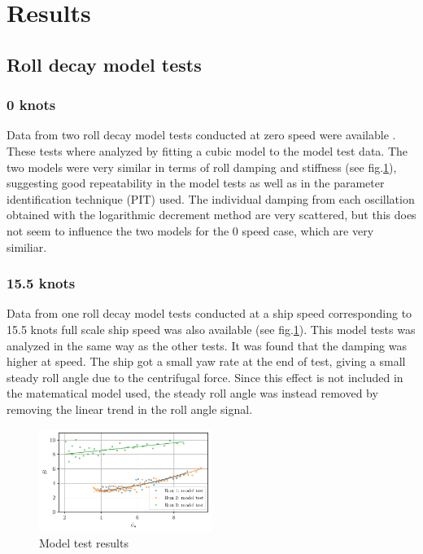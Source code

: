 \section{Results}\label{results}

    \subsection{Roll decay model tests}\label{roll-decay-model-tests}

\subsubsection{0 knots}\label{knots}

Data from two roll decay model tests conducted at zero speed were
available
.
These tests where analyzed by fitting a cubic model
to the model test data. The two models were very similar in terms of
roll damping and stiffness (see fig.\ref{fig:mdl}), suggesting
good repeatability in the model tests as well as in the parameter
identification technique (PIT) used. The individual damping from each
oscillation obtained with the logarithmic decrement method are very
scattered, but this does not seem to influence the two models for the 0
speed case, which are very similiar.

    \subsubsection{15.5 knots}\label{knots}

Data from one roll decay model tests conducted at a ship speed
corresponding to 15.5 knots full scale ship speed was also available
(see fig.\ref{fig:mdl}). This model tests was analyzed in the
same way as the other tests. It was found that the damping was higher at
speed. The ship got a small yaw rate
 at the end of test, giving a small steady roll angle due to the
centrifugal force. Since this effect is not included in the matematical
model used, the steady roll angle was instead removed by removing the
linear trend in the roll angle signal.

    

    \begin{figure}[H]
        \begin{center}\includegraphics[width = 0.5\textwidth]{figures/mdl.pdf}\end{center}
        \vspace{-1cm}
        \caption{Model test results}
        \label{fig:mdl}
    \end{figure}
    
